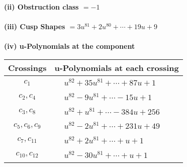 \documentclass[1p]{elsarticle_modified}
\theoremstyle{definition}
\begin{document}
\flushleft \textbf{(ii) Obstruction class $= -1$}\\~\\
\flushleft \textbf{(iii) Cusp Shapes $= 3 u^{81}+2 u^{80}+\cdots+19 u+9$}\\~\\
\newpage\renewcommand{\arraystretch}{1}
\flushleft \textbf{(iv) u-Polynomials at the component}\newline \\
\begin{tabular}{m{50pt}|m{274pt}}
Crossings & \hspace{64pt}u-Polynomials at each crossing \\
\hline $$\begin{aligned}c_{1}\end{aligned}$$&$\begin{aligned}
&u^{82}+35 u^{81}+\cdots+87 u+1
\end{aligned}$\\
\hline $$\begin{aligned}c_{2},c_{4}\end{aligned}$$&$\begin{aligned}
&u^{82}-9 u^{81}+\cdots-15 u+1
\end{aligned}$\\
\hline $$\begin{aligned}c_{3},c_{8}\end{aligned}$$&$\begin{aligned}
&u^{82}+u^{81}+\cdots-384 u+256
\end{aligned}$\\
\hline $$\begin{aligned}c_{5},c_{6},c_{9}\end{aligned}$$&$\begin{aligned}
&u^{82}-2 u^{81}+\cdots+231 u+49
\end{aligned}$\\
\hline $$\begin{aligned}c_{7},c_{11}\end{aligned}$$&$\begin{aligned}
&u^{82}+2 u^{81}+\cdots+u+1
\end{aligned}$\\
\hline $$\begin{aligned}c_{10},c_{12}\end{aligned}$$&$\begin{aligned}
&u^{82}-30 u^{81}+\cdots+u+1
\end{aligned}$\\
\hline
\end{tabular}\\~\\
\end{document}
